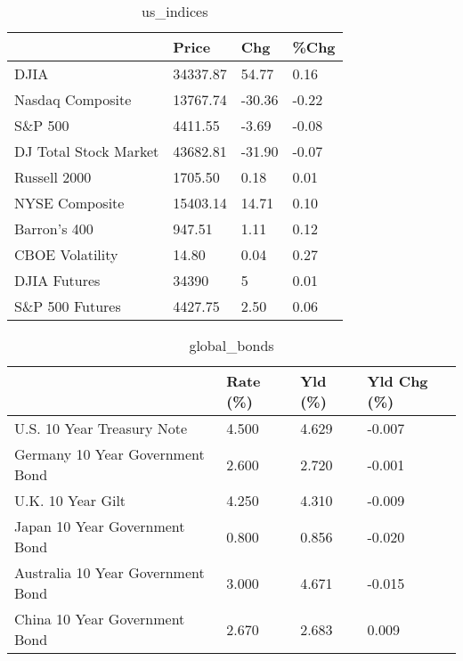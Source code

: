 \documentclass{article}%
\begin{document}
%


\begin{table}[htbp]%
\caption{us\_indices}%
\centering%
\begin{adjustbox}{width=1\textwidth}%
\begin{tabular}{llll}
\toprule
                      &    Price &    Chg &  \%Chg \\
\midrule
                 DJIA & 34337.87 &  54.77 &  0.16 \\
     Nasdaq Composite & 13767.74 & -30.36 & -0.22 \\
              S\&P 500 &  4411.55 &  -3.69 & -0.08 \\
DJ Total Stock Market & 43682.81 & -31.90 & -0.07 \\
         Russell 2000 &  1705.50 &   0.18 &  0.01 \\
       NYSE Composite & 15403.14 &  14.71 &  0.10 \\
         Barron's 400 &   947.51 &   1.11 &  0.12 \\
      CBOE Volatility &    14.80 &   0.04 &  0.27 \\
         DJIA Futures &    34390 &      5 &  0.01 \\
      S\&P 500 Futures &  4427.75 &   2.50 &  0.06 \\
\bottomrule
\end{tabular}
%
\end{adjustbox}%
\end{table}

%


\begin{table}[htbp]%
\caption{global\_bonds}%
\centering%
\begin{adjustbox}{width=1\textwidth}%
\begin{tabular}{llll}
\toprule
                                  & Rate (\%) & Yld (\%) & Yld Chg (\%) \\
\midrule
       U.S. 10 Year Treasury Note &    4.500 &   4.629 &      -0.007 \\
  Germany 10 Year Government Bond &    2.600 &   2.720 &      -0.001 \\
                U.K. 10 Year Gilt &    4.250 &   4.310 &      -0.009 \\
    Japan 10 Year Government Bond &    0.800 &   0.856 &      -0.020 \\
Australia 10 Year Government Bond &    3.000 &   4.671 &      -0.015 \\
    China 10 Year Government Bond &    2.670 &   2.683 &       0.009 \\
\bottomrule
\end{tabular}
%
\end{adjustbox}%
\end{table}
\end{document}
